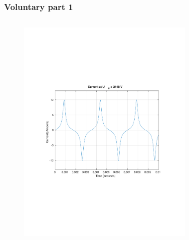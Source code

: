 \documentclass[aspectratio=1610]{beamer}
\begin{document}
\begin{frame}
\frametitle{Voluntary part 1}
	\begin{columns}
			\begin{figure}
				\includegraphics[scale=0.4]{figs/voluntary_1_Umax.pdf}
			\end{figure}
			\begin{figure}

\end{figure}
\end{columns}
\end{frame}
\end{document}

